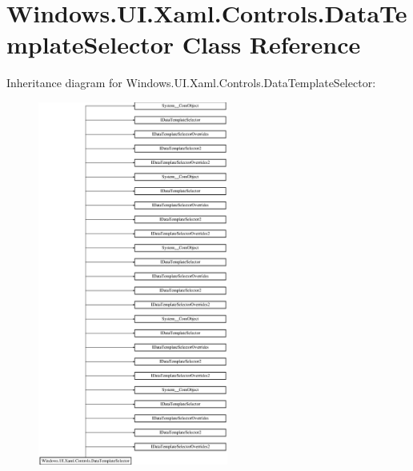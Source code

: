 \hypertarget{class_windows_1_1_u_i_1_1_xaml_1_1_controls_1_1_data_template_selector}{}\section{Windows.\+U\+I.\+Xaml.\+Controls.\+Data\+Template\+Selector Class Reference}
\label{class_windows_1_1_u_i_1_1_xaml_1_1_controls_1_1_data_template_selector}
Inheritance diagram for Windows.\+U\+I.\+Xaml.\+Controls.\+Data\+Template\+Selector\+:\begin{figure}[H]
\begin{center}
\leavevmode
\includegraphics[height=12.000000cm]{class_windows_1_1_u_i_1_1_xaml_1_1_controls_1_1_data_template_selector}
\end{center}
\end{figure}
